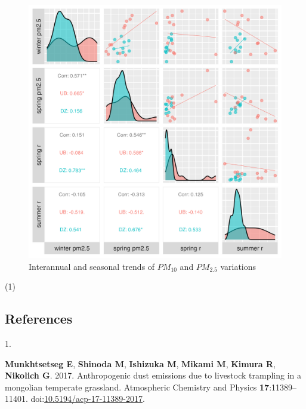 \documentclass[
  11pt,
]{article}
\newlength{\cslhangindent}
\newlength{\csllabelwidth}
\newenvironment{CSLReferences}[2] %
 {\begin{list}{}{%
  \setlength{\itemindent}{0pt}
  \setlength{\leftmargin}{0pt}
  \setlength{\parsep}{0pt}
  \ifodd #1
   \setlength{\leftmargin}{\cslhangindent}
   \setlength{\itemindent}{-1\cslhangindent}
  \fi
  \setlength{\itemsep}{#2\baselineskip}}}
 {\end{list}}
\newcommand{\CSLLeftMargin}[1]{\parbox[t]{\csllabelwidth}{\strut#1\strut}}
\newcommand{\CSLRightInline}[1]{\parbox[t]{\linewidth - \csllabelwidth}{\strut#1\strut}}
\begin{document}
\begin{figure}
\centering
\includegraphics[width=6.25in,height=\textheight,keepaspectratio]{images/figure_9_supplement.png}
\caption{Interannual and seasonal trends of \(PM_{10}\) and \(PM_{2.5}\)
variations}
\end{figure}

(1)

\newpage

\subsection*{References}\label{references}

\label{refs}
\begin{CSLReferences}{0}{1}
\CSLLeftMargin{1. }%
\CSLRightInline{\textbf{Munkhtsetseg E}, \textbf{Shinoda M},
\textbf{Ishizuka M}, \textbf{Mikami M}, \textbf{Kimura R},
\textbf{Nikolich G}. 2017. Anthropogenic dust emissions due to livestock
trampling in a mongolian temperate grassland. Atmospheric Chemistry and
Physics \textbf{17}:11389--11401.
doi:\href{https://doi.org/10.5194/acp-17-11389-2017}{10.5194/acp-17-11389-2017}.}

\end{CSLReferences}
\end{document}
